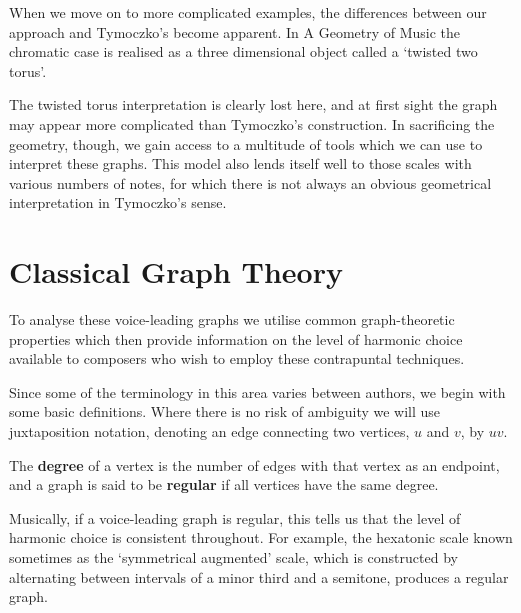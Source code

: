 \documentclass[]{tMAM2e}
\begin{document}
When we move on to more complicated examples, the differences between our approach and Tymoczko's become apparent. In A Geometry of Music the chromatic case is realised as a three dimensional object called a `twisted two torus'. %


The twisted torus interpretation is clearly lost here, and at first sight the graph may appear more complicated than Tymoczko's construction. In sacrificing the geometry, though, we gain access to a multitude of tools which we can use to interpret these graphs. This model also lends itself well to those scales with various numbers of notes, for which there is not always an obvious geometrical interpretation in Tymoczko's sense.



\section{Classical Graph Theory}

To analyse these voice-leading graphs we utilise common graph-theoretic properties which then provide information on the level of harmonic choice available to composers who wish to employ these contrapuntal techniques. 

Since some of the terminology in this area varies between authors, we begin with some basic definitions. Where there is no risk of ambiguity we will use juxtaposition notation, denoting an edge connecting two vertices, $u$ and $v$, by $uv$.

\begin{definition}
The \textbf{degree} of a vertex is the number of edges with that vertex as an endpoint, and a graph is said to be \textbf{regular} if all vertices have the same degree.
\end{definition}

Musically, if a voice-leading graph is regular, this tells us that the level of harmonic choice is consistent throughout. For example, the hexatonic scale known sometimes as the `symmetrical augmented' scale, which is constructed by alternating between intervals of a minor third and a semitone, produces a regular graph. %

\end{document}
